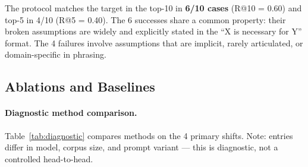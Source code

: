 \documentclass[11pt]{article}
\begin{document}
\begin{table}[t]
\centering
\caption{Main results --- GPT-4o clean prompt (no few-shot examples, 15 papers/paradigm). Rank = position in confidence-ordered extraction list.}
\label{tab:results}
\footnotesize
\setlength{\tabcolsep}{4pt}
\end{table}

The protocol matches the target in the top-10 in \textbf{6/10 cases} (R@10 = 0.60) and top-5 in 4/10 (R@5 = 0.40). The 6 successes share a common property: their broken assumptions are widely and explicitly stated in the ``X is necessary for Y'' format. The 4 failures involve assumptions that are implicit, rarely articulated, or domain-specific in phrasing.

\subsection{Ablations and Baselines}\label{sec:baselines}

\paragraph{Diagnostic method comparison.}
Table~\ref{tab:diagnostic} compares methods on the 4 primary shifts. Note: entries differ in model, corpus size, and prompt variant --- this is diagnostic, not a controlled head-to-head.
\end{document}
